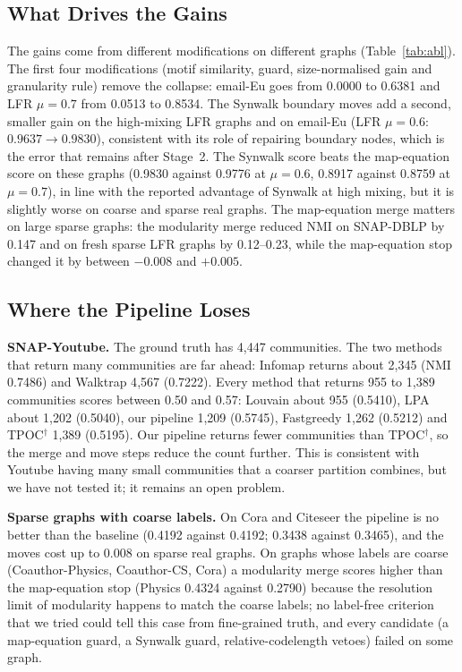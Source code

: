 \documentclass[conference]{IEEEtran}
\begin{document}
\subsection{What Drives the Gains}
The gains come from different modifications on different graphs (Table~\ref{tab:abl}). The first four modifications (motif similarity, guard, size-normalised gain and granularity rule) remove the collapse: email-Eu goes from 0.0000 to 0.6381 and LFR $\mu{=}0.7$ from 0.0513 to 0.8534. The Synwalk boundary moves add a second, smaller gain on the high-mixing LFR graphs and on email-Eu (LFR $\mu{=}0.6$: $0.9637\to0.9830$), consistent with its role of repairing boundary nodes, which is the error that remains after Stage~2. The Synwalk score beats the map-equation score on these graphs (0.9830 against 0.9776 at $\mu{=}0.6$, 0.8917 against 0.8759 at $\mu{=}0.7$), in line with the reported advantage of Synwalk at high mixing, but it is slightly worse on coarse and sparse real graphs. The map-equation merge matters on large sparse graphs: the modularity merge reduced NMI on SNAP-DBLP by 0.147 and on fresh sparse LFR graphs by 0.12--0.23, while the map-equation stop changed it by between $-0.008$ and $+0.005$.

\subsection{Where the Pipeline Loses}
\textbf{SNAP-Youtube.} The ground truth has 4{,}447 communities. The two methods that return many communities are far ahead: Infomap returns about 2{,}345 (NMI 0.7486) and Walktrap 4{,}567 (0.7222). Every method that returns 955 to 1{,}389 communities scores between 0.50 and 0.57: Louvain about 955 (0.5410), LPA about 1{,}202 (0.5040), our pipeline 1{,}209 (0.5745), Fastgreedy 1{,}262 (0.5212) and TPOC$^{\dagger}$ 1{,}389 (0.5195). Our pipeline returns fewer communities than TPOC$^{\dagger}$, so the merge and move steps reduce the count further. This is consistent with Youtube having many small communities that a coarser partition combines, but we have not tested it; it remains an open problem.

\textbf{Sparse graphs with coarse labels.} On Cora and Citeseer the pipeline is no better than the baseline (0.4192 against 0.4192; 0.3438 against 0.3465), and the moves cost up to 0.008 on sparse real graphs. On graphs whose labels are coarse (Coauthor-Physics, Coauthor-CS, Cora) a modularity merge scores higher than the map-equation stop (Physics 0.4324 against 0.2790) because the resolution limit of modularity happens to match the coarse labels; no label-free criterion that we tried could tell this case from fine-grained truth, and every candidate (a map-equation guard, a Synwalk guard, relative-codelength vetoes) failed on some graph.
\end{document}
